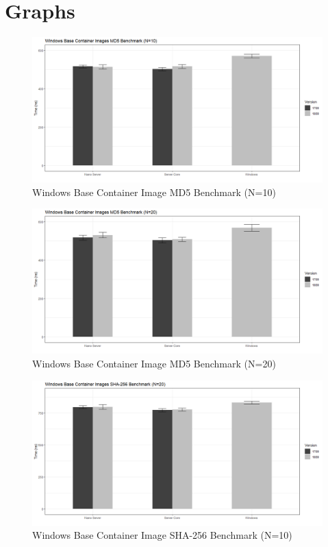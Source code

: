 \section{Graphs}
\begin{figure}[h]
	\captionsetup{width=0.8\linewidth}
	\includegraphics[width=0.9\linewidth]{img/MD5_10.png}
	\centering
	\caption{Windows Base Container Image MD5 Benchmark (N=10)}
	\label{fig:MD5_10}
\end{figure}
\begin{figure}[h]
	\captionsetup{width=0.8\linewidth}
	\includegraphics[width=0.9\linewidth]{img/MD5_20.png}
	\centering
	\caption{Windows Base Container Image MD5 Benchmark (N=20)}
	\label{fig:MD5_20}
\end{figure}
\begin{figure}[h]
	\captionsetup{width=0.8\linewidth}
	\includegraphics[width=0.9\linewidth]{img/SHA_20.png}
	\centering
	\caption{Windows Base Container Image SHA-256 Benchmark (N=10)}
	\label{fig:SHA_10}
\end{figure}
